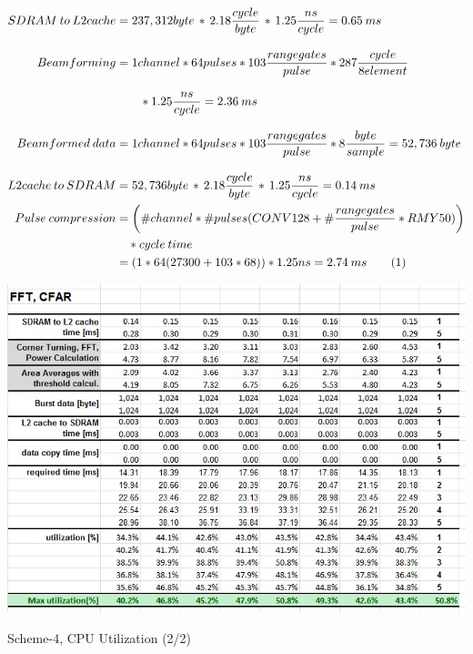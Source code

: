 \begin{align*}
\label{aa:scheme5:equ1}
	SDRAM \: to \: L2cache &= 237,312 byte \, * \, 2.18\frac{cycle}{byte} \, * \, 1.25\frac{ns}{cycle} = 0.65 \: ms \\[0.3cm]
	Beamforming &= 1channel * 64pulses * 103 \frac{range gates}{pulse} * 287\frac{cycle}{8 element} \\[0.3cm] 
	&\qquad * 1.25\frac{ns}{cycle} = 2.36 \: ms\\[0.3cm]
	Beamformed \: data &= 1channel * 64pulses * 103 \frac{range gates}{pulse} *8\frac{byte}{sample} = 52,736 \: byte \\[0.3cm]
	L2cache \: to \: SDRAM &= 52,736 byte \, * \, 2.18\frac{cycle}{byte} \, * \, 1.25\frac{ns}{cycle} = 0.14 \: ms \\
	Pulse \: compression &= \bigg(\#channel * \#pulses (CONV128 +  \# \frac{range gates}{pulse} * RMY50)\bigg) \\
			& \quad * cycle \: time \\
			&= (1 * 64 (27300 + 103 * 68)) * 1.25ns = 2.74 \: ms \stepcounter{equation}\tag{\theequation} 
\end{align*}

\begin{table}[h!]
	\centering
	\includegraphics[width=160mm]{figures/scheme5_cpu_util2}
	\caption{Scheme-4, CPU Utilization (2/2)}
	\label{fig:mm:scheme5_cpu_util2}
\end{table}

